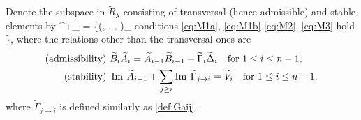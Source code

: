 \documentclass[11pt,reqno]{amsart}
\numberwithin{equation}{section}
\theoremstyle{definition}
\newcommand{\fT}{\mathfrak{T}}
\newcommand{\ld}{\lambda}
\newcommand{\tA}{\widetilde{A}}
\newcommand{\tB}{\widetilde{B}}
\newcommand{\tDe}{\widetilde{\Delta}}
\newcommand{\tGa}{\widetilde{\Gamma}}
\newcommand{\tV}{\widetilde{V}}
\renewcommand{\Im}{\mathop{\text{Im}}}
\begin{document}
\endeq
\enddefn
Denote the subspace in $\widetilde{R}_{\ld}$ consisting of transversal (hence admissible) and stable elements by 
\eq\label{def:cT+}
\fT^+_{\ld} = \{(\tA, \tB, \tGa, \tDe)\in {}_{\ld}\mid
\textup{conditions }
\eqref{eq:M1a}, \eqref{eq:M1b} \eqref{eq:M2}, \eqref{eq:M3}
\textup{ hold} \},
\endeq
where the relations other than the transversal ones are
\begin{align}
\textup{(admissibility)}~&\tB_i\tA_i = \tA_{i-1} \tB_{i-1} + \tGa_i \tDe_i
\quad \mbox{for } 1\leq i\leq n-1, 
\label{eq:M2}
\\
\textup{(stability)}~&\Im \: \tA_{i-1} + \sum_{j\geq i} \Im \: \tGa_{j\to i} = \tV_i
\quad \mbox{for } 1\leq i\leq n-1,
\label{eq:M3}
\end{align}
where $\tGa_{j\to i}$ is defined similarly as \eqref{def:Gaij}.
\end{document}
